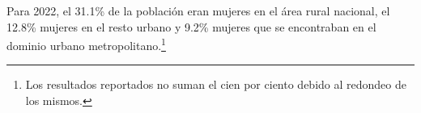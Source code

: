 Para 2022, el 31.1\% de la población eran mujeres en el área rural nacional, el 12.8\% mujeres en el resto urbano y 9.2\% mujeres que se encontraban en el dominio urbano metropolitano.\footnote{Los resultados reportados no suman el cien por ciento debido al redondeo de los mismos.}